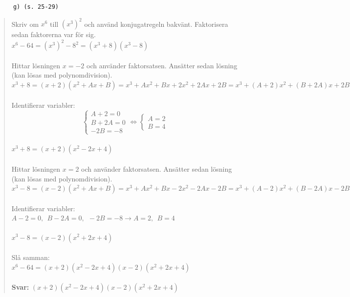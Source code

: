 \documentclass[a4paper]{article}
\newcommand{\tskcol}[1]{\textcolor{tskcol}{#1}}
\begin{document}
	\pagebreak
	\texttt{\tskcol{~~~~~~g) (s. 25-29)}}
	\begin{quotation}
		\noindent
		Skriv om $x^6$ till $(x^3)^2$ och använd konjugatregeln bakvänt. Faktorisera sedan faktorerna var för sig. \\
		$x^6-64=(x^3)^2-8^2=(x^3+8)(x^3-8)$ \\ \\
		Hittar lösningen $x=-2$ och använder faktorsatsen. Ansätter sedan lösning (kan lösas med polynomdivision).\\
		$x^3+8=(x+2)(x^2+Ax+B)=x^3+Ax^2+Bx+2x^2+2Ax+2B=x^3+(A+2)x^2+(B+2A)x+2B$ \\ \\
		Identifierar variabler: \\
		\[\begin{cases}
		A+2=0 \\
		B+2A=0 \\
		-2B=-8
		\end{cases}
		\Leftrightarrow
		\begin{cases}
		A=2 \\
		B=4 
		\end{cases}\] \\
		$x^3+8=(x+2)(x^2-2x+4)$ \\ \\
		Hittar lösningen $x=2$ och använder faktorsatsen. Ansätter sedan lösning (kan lösas med polynomdivision).\\
		$x^3-8=(x-2)(x^2+Ax+B)=x^3+Ax^2+Bx-2x^2-2Ax-2B=x^3+(A-2)x^2+(B-2A)x-2B$ \\ \\
		Identifierar variabler: \\
		$A-2=0,~~B-2A=0,~~-2B=-8 \rightarrow A=2,~~B=4$ \\ \\
		$x^3-8=(x-2)(x^2+2x+4)$ \\ \\
		Slå samman: \\
		$x^6-64=(x+2)(x^2-2x+4)(x-2)(x^2+2x+4)$
		\\ \\
		\textbf{Svar:} $(x+2)(x^2-2x+4)(x-2)(x^2+2x+4)$
	\end{quotation}
	
\end{document}
